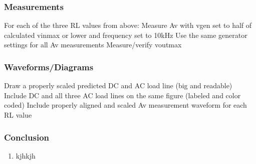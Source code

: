 \documentclass[main.tex]{subfiles}
\begin{document}
\subsubsection*{Measurements}
\begin{enumerate}
For each of the three RL values from above:
Measure Av with vgen set to half of calculated vinmax or lower and frequency set to 10kHz
Use the same generator settings for all Av measurements
Measure/verify voutmax 
\end{enumerate}

\subsubsection*{Waveforms/Diagrams}
\begin{enumerate}
Draw a properly scaled predicted DC and AC load line (big and readable)
Include DC and all three AC load lines on the same figure (labeled and color coded)
Include properly aligned and scaled Av measurement waveform for each RL value
\end{enumerate}

\subsubsection*{Conclusion}
\begin{enumerate}
  \item kjhkjh  
\end{enumerate}

\end{document}
